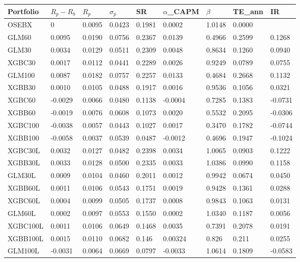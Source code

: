 \begin{table}[H]
\centering
\footnotesize
\begin{tabularx}{\textwidth}{Xllllllll}
\toprule
Portfolio & $R_p-R_b$ & $R_p$ & $\sigma_p$ & SR & $\alpha$_{CAPM} & $\beta$ & TE_{ann} & IR \\
\midrule
OSEBX & 0 & 0.0095 & 0.0423 & 0.1981 & 0.0002 & 1.0148 & 0.0000 &  \\ 
\midrule
   GLM60 & 0.0095  & 0.0190 & 0.0756 & 0.2367 & 0.0139 & 0.4966 & 0.2599 & 0.1268 \\ 
   GLM30 & 0.0034  & 0.0129 & 0.0511 & 0.2309 & 0.0048 & 0.8634 & 0.1260 & 0.0940 \\ 
  XGBC30 & 0.0017  & 0.0112 & 0.0441 & 0.2289 & 0.0026 & 0.9249 & 0.0789 & 0.0755 \\ 
  GLM100 & 0.0087  & 0.0182 & 0.0757 & 0.2257 & 0.0133 & 0.4684 & 0.2668 & 0.1132 \\ 
  XGBB30 & 0.0010  & 0.0105 & 0.0488 & 0.1917 & 0.0016 & 0.9536 & 0.1056 & 0.0321 \\  
  XGBC60 & -0.0029 & 0.0066 & 0.0480 & 0.1138 & -0.0004 & 0.7285 & 0.1383 & -0.0731 \\ 
  XGBB60 & -0.0019 & 0.0076 & 0.0608 & 0.1073 & 0.0020 & 0.5532 & 0.2095 & -0.0306 \\ 
 XGBC100 & -0.0038 & 0.0057 & 0.0443 & 0.1027 & 0.0017 & 0.3470 & 0.1782 & -0.0744 \\ 
 XGBB100 & -0.0058 & 0.0037 & 0.0539 & 0.0487 & -0.0012 & 0.4696 & 0.1947 & -0.1024 \\ 
 \midrule
 XGBC30L & 0.0032  & 0.0127 & 0.0482 & 0.2398 & 0.0034 & 1.0065 & 0.0903 & 0.1222 \\ 
 XGBB30L & 0.0033  & 0.0128 & 0.0500 & 0.2335 & 0.0033 & 1.0386 & 0.0990 & 0.1158 \\ 
  GLM30L & 0.0009  & 0.0104 & 0.0460 & 0.2011 & 0.0012 & 0.9942 & 0.0674 & 0.0450 \\ 
 XGBB60L & 0.0011  & 0.0106 & 0.0543 & 0.1751 & 0.0019 & 0.9428 & 0.1361 & 0.0288 \\ 
 XGBC60L & 0.0004  & 0.0099 & 0.0505 & 0.1737 & 0.0008 & 0.9843 & 0.1063 & 0.0131 \\ 
  GLM60L & 0.0002  & 0.0097 & 0.0553 & 0.1550 & 0.0002 & 1.0340 & 0.1187 & 0.0056 \\ 
XGBC100L & 0.0011  & 0.0106 & 0.0649 & 0.1468 & 0.0035 & 0.7391 & 0.2078 & 0.0191 \\
XGBB100L & 0.0015  & 0.0110 & 0.0682 & 0.146 & 0.00324 & 0.826 & 0.211 & 0.0255 \\ 
 GLM100L & -0.0031 & 0.0064 & 0.0669 & 0.0797 & -0.0033 & 1.0614 & 0.1809 & -0.0583 \\ 

\end{tabularx}
\end{table}
